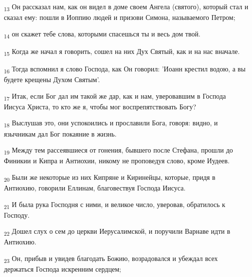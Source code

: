 \begin{tcolorbox}
\textsubscript{13} Он рассказал нам, как он видел в доме своем Ангела (святого), который стал и сказал ему: пошли в Иоппию людей и призови Симона, называемого Петром;
\end{tcolorbox}
\begin{tcolorbox}
\textsubscript{14} он скажет тебе слова, которыми спасешься ты и весь дом твой.
\end{tcolorbox}
\begin{tcolorbox}
\textsubscript{15} Когда же начал я говорить, сошел на них Дух Святый, как и на нас вначале.
\end{tcolorbox}
\begin{tcolorbox}
\textsubscript{16} Тогда вспомнил я слово Господа, как Он говорил: 'Иоанн крестил водою, а вы будете крещены Духом Святым'.
\end{tcolorbox}
\begin{tcolorbox}
\textsubscript{17} Итак, если Бог дал им такой же дар, как и нам, уверовавшим в Господа Иисуса Христа, то кто же я, чтобы мог воспрепятствовать Богу?
\end{tcolorbox}
\begin{tcolorbox}
\textsubscript{18} Выслушав это, они успокоились и прославили Бога, говоря: видно, и язычникам дал Бог покаяние в жизнь.
\end{tcolorbox}
\begin{tcolorbox}
\textsubscript{19} Между тем рассеявшиеся от гонения, бывшего после Стефана, прошли до Финикии и Кипра и Антиохии, никому не проповедуя слово, кроме Иудеев.
\end{tcolorbox}
\begin{tcolorbox}
\textsubscript{20} Были же некоторые из них Кипряне и Киринейцы, которые, придя в Антиохию, говорили Еллинам, благовествуя Господа Иисуса.
\end{tcolorbox}
\begin{tcolorbox}
\textsubscript{21} И была рука Господня с ними, и великое число, уверовав, обратилось к Господу.
\end{tcolorbox}
\begin{tcolorbox}
\textsubscript{22} Дошел слух о сем до церкви Иерусалимской, и поручили Варнаве идти в Антиохию.
\end{tcolorbox}
\begin{tcolorbox}
\textsubscript{23} Он, прибыв и увидев благодать Божию, возрадовался и убеждал всех держаться Господа искренним сердцем;
\end{tcolorbox}
